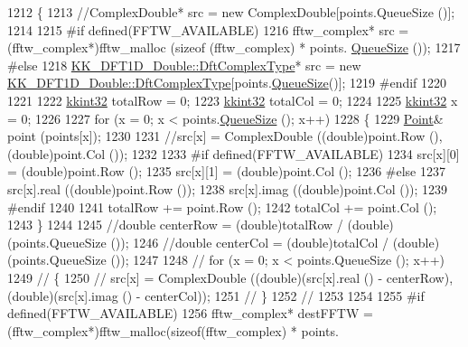 \begin{DoxyCode}
1212 \{
1213   \textcolor{comment}{//ComplexDouble*  src = new ComplexDouble[points.QueueSize ()];}
1214 
1215 \textcolor{preprocessor}{  #if  defined(FFTW\_AVAILABLE)}
1216      fftw\_complex*  src = (fftw\_complex*)fftw\_malloc (\textcolor{keyword}{sizeof} (fftw\_complex) * points.
      \hyperlink{class_k_k_b_1_1_k_k_queue_a1dab601f75ee6a65d97f02bddf71c40d}{QueueSize} ());
1217 \textcolor{preprocessor}{  #else}
1218      \hyperlink{class_k_k_b_1_1_k_k___d_f_t1_d_a4cbc827157dd30ddec2d3753e552a827}{KK\_DFT1D\_Double::DftComplexType}*  src = \textcolor{keyword}{new} 
      \hyperlink{class_k_k_b_1_1_k_k___d_f_t1_d_a4cbc827157dd30ddec2d3753e552a827}{KK\_DFT1D\_Double::DftComplexType}[points.\hyperlink{class_k_k_b_1_1_k_k_queue_a1dab601f75ee6a65d97f02bddf71c40d}{QueueSize}()];
1219 \textcolor{preprocessor}{  #endif}
1220 
1221 
1222   \hyperlink{namespace_k_k_b_a8fa4952cc84fda1de4bec1fbdd8d5b1b}{kkint32}  totalRow = 0;
1223   \hyperlink{namespace_k_k_b_a8fa4952cc84fda1de4bec1fbdd8d5b1b}{kkint32}  totalCol = 0;
1224 
1225   \hyperlink{namespace_k_k_b_a8fa4952cc84fda1de4bec1fbdd8d5b1b}{kkint32}  x = 0;
1226 
1227   \textcolor{keywordflow}{for}  (x = 0;  x < points.\hyperlink{class_k_k_b_1_1_k_k_queue_a1dab601f75ee6a65d97f02bddf71c40d}{QueueSize} ();  x++)
1228   \{
1229     \hyperlink{class_k_k_b_1_1_point}{Point}&  point (points[x]);
1230 
1231     \textcolor{comment}{//src[x] = ComplexDouble ((double)point.Row (), (double)point.Col ());}
1232 
1233 \textcolor{preprocessor}{    #if  defined(FFTW\_AVAILABLE)}
1234       src[x][0] = (double)point.Row ();
1235       src[x][1] = (double)point.Col ();
1236 \textcolor{preprocessor}{    #else}
1237       src[x].real ((\textcolor{keywordtype}{double})point.Row ());
1238       src[x].imag ((\textcolor{keywordtype}{double})point.Col ());
1239 \textcolor{preprocessor}{    #endif}
1240 
1241     totalRow += point.Row ();
1242     totalCol += point.Col ();
1243   \}
1244 
1245   \textcolor{comment}{//double  centerRow = (double)totalRow / (double)(points.QueueSize ());}
1246   \textcolor{comment}{//double  centerCol = (double)totalCol / (double)(points.QueueSize ());}
1247 
1248 \textcolor{comment}{//  for  (x = 0;  x < points.QueueSize ();  x++)}
1249 \textcolor{comment}{//  \{}
1250 \textcolor{comment}{//    src[x] = ComplexDouble ((double)(src[x].real () - centerRow), (double)(src[x].imag () - centerCol));}
1251 \textcolor{comment}{//  \}}
1252 \textcolor{comment}{//}
1253 
1254 
1255 \textcolor{preprocessor}{  #if  defined(FFTW\_AVAILABLE)}
1256     fftw\_complex*   destFFTW = (fftw\_complex*)fftw\_malloc(\textcolor{keyword}{sizeof}(fftw\_complex) * points.

\end{DoxyCode}
